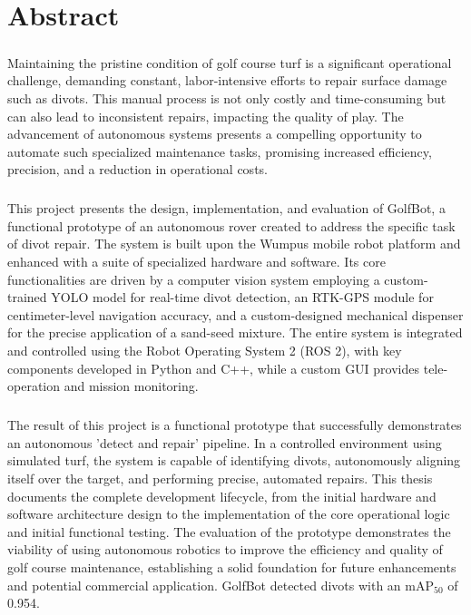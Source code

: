 \chapter*{Abstract}


    \paragraph{} 
    Maintaining the pristine condition of golf course turf is a significant operational challenge, demanding constant, labor-intensive efforts to repair surface damage such as divots. This manual process is not only costly and time-consuming but can also lead to inconsistent repairs, impacting the quality of play. The advancement of autonomous systems presents a compelling opportunity to automate such specialized maintenance tasks, promising increased efficiency, precision, and a reduction in operational costs.
    
    \paragraph{}
    This project presents the design, implementation, and evaluation of GolfBot, a functional prototype of an autonomous rover created to address the specific task of divot repair. The system is built upon the Wumpus mobile robot platform and enhanced with a suite of specialized hardware and software. Its core functionalities are driven by a computer vision system employing a custom-trained YOLO model for real-time divot detection, an RTK-GPS module for centimeter-level navigation accuracy, and a custom-designed mechanical dispenser for the precise application of a sand-seed mixture. The entire system is integrated and controlled using the Robot Operating System 2 (ROS 2), with key components developed in Python and C++, while a custom GUI provides tele-operation and mission monitoring.

    \paragraph{} 
    The result of this project is a functional prototype that successfully demonstrates an autonomous 'detect and repair' pipeline. In a controlled environment using simulated turf, the system is capable of identifying divots, autonomously aligning itself over the target, and performing precise, automated repairs. This thesis documents the complete development lifecycle, from the initial hardware and software architecture design to the implementation of the core operational logic and initial functional testing. The evaluation of the prototype demonstrates the viability of using autonomous robotics to improve the efficiency and quality of golf course maintenance, establishing a solid foundation for future enhancements and potential commercial application. GolfBot detected divots with an mAP$_{50}$ of 0.954.
     
